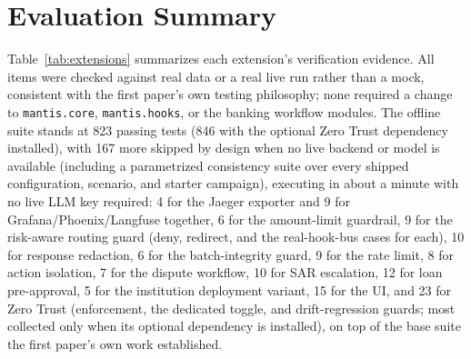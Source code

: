 \documentclass[conference]{IEEEtran}
\begin{document}
\section{Evaluation Summary}

Table~\ref{tab:extensions} summarizes each extension's verification evidence. All items were checked against real data or a real live run rather than a mock, consistent with the first paper's own testing philosophy; none required a change to \texttt{mantis.core}, \texttt{mantis.hooks}, or the banking workflow modules. The offline suite stands at 823 passing tests (846 with the optional Zero Trust dependency installed), with 167 more skipped by design when no live backend or model is available (including a parametrized consistency suite over every shipped configuration, scenario, and starter campaign), executing in about a minute with no live LLM key required: 4 for the Jaeger exporter and 9 for Grafana/Phoenix/Langfuse together, 6 for the amount-limit guardrail, 9 for the risk-aware routing guard (deny, redirect, and the real-hook-bus cases for each), 10 for response redaction, 6 for the batch-integrity guard, 9 for the rate limit, 8 for action isolation, 7 for the dispute workflow, 10 for SAR escalation, 12 for loan pre-approval, 5 for the institution deployment variant, 15 for the UI, and 23 for Zero Trust (enforcement, the dedicated toggle, and drift-regression guards; most collected only when its optional dependency is installed), on top of the base suite the first paper's own work established.
\end{document}
